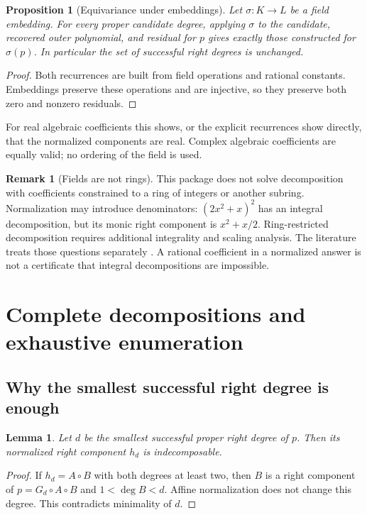 \documentclass[11pt,a4paper]{article}
\newtheorem{lemma}[theorem]{Lemma}
\newtheorem{proposition}[theorem]{Proposition}
\theoremstyle{definition}
\newtheorem{remark}[theorem]{Remark}
\begin{document}
\begin{proposition}[Equivariance under embeddings]
Let $\sigma:K\to L$ be a field embedding. For every proper candidate degree, applying $\sigma$ to the candidate, recovered outer polynomial, and residual for $p$ gives exactly those constructed for $\sigma(p)$. In particular the set of successful right degrees is unchanged.
\end{proposition}
\begin{proof}
Both recurrences are built from field operations and rational constants. Embeddings preserve these operations and are injective, so they preserve both zero and nonzero residuals.
\end{proof}

For real algebraic coefficients this shows, or the explicit recurrences show directly, that the normalized components are real. Complex algebraic coefficients are equally valid; no ordering of the field is used.

\begin{remark}[Fields are not rings]
This package does not solve decomposition with coefficients constrained to a ring of integers or another subring. Normalization may introduce denominators: $(2x^2+x)^2$ has an integral decomposition, but its monic right component is $x^2+x/2$. Ring-restricted decomposition requires additional integrality and scaling analysis. The literature treats those questions separately \cite{wymanzieve}. A rational coefficient in a normalized answer is not a certificate that integral decompositions are impossible.
\end{remark}

\section{Complete decompositions and exhaustive enumeration}
\subsection{Why the smallest successful right degree is enough}
\begin{lemma}\label{lem:minimal}
Let $d$ be the smallest successful proper right degree of $p$. Then its normalized right component $h_d$ is indecomposable.
\end{lemma}
\begin{proof}
If $h_d=A\circ B$ with both degrees at least two, then $B$ is a right component of $p=G_d\circ A\circ B$ and $1<\deg B<d$. Affine normalization does not change this degree. This contradicts minimality of $d$.
\end{proof}
\end{document}
